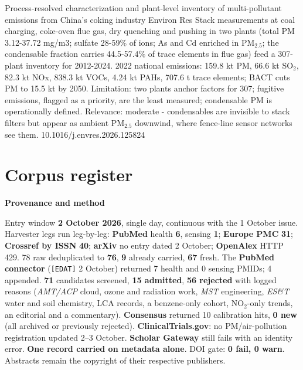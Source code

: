 \documentclass[10pt]{article}
\begin{document}
\par{}\baselineskip{}\baselineskip
{}

{Process-resolved characterization and plant-level inventory of multi-pollutant emissions from China's coking industry}
{Environ Res}
{Stack measurements at coal charging, coke-oven flue gas, dry quenching and pushing in two plants (total PM 3.12-37.72 mg/m3; sulfate 28-59\% of ions; As and Cd enriched in PM$_{2.5}$; the condensable fraction carries 44.5-57.4\% of trace elements in flue gas) feed a 307-plant inventory for 2012-2024. 2022 national emissions: 159.8 kt PM, 66.6 kt SO$_2$, 82.3 kt NOx, 838.3 kt VOCs, 4.24 kt PAHs, 707.6 t trace elements; BACT cuts PM to 15.5 kt by 2050. Limitation: two plants anchor factors for 307; fugitive emissions, flagged as a priority, are the least measured; condensable PM is operationally defined. Relevance: moderate - condensables are invisible to stack filters but appear as ambient PM$_{2.5}$ downwind, where fence-line sensor networks see them.}
{10.1016/j.envres.2026.125824}

\clearpage
\section*{\sffamily\bfseries\color{Deep}Corpus register}
\vspace{-1.5mm}{\color{Amber}\rule{\linewidth}{1.1pt}}\vspace{2.5mm}



\vspace{2mm}

\begin{keybox}
{\sffamily\bfseries\footnotesize\color{Deep}Provenance and method}\\[1.2mm]
{\fontsize{7.2}{8.8}\selectfont
Entry window \textbf{2 October 2026}, single day, continuous with the 1 October issue. Harvester
legs run leg-by-leg: \textbf{PubMed} health \textbf{6}, sensing \textbf{1}; \textbf{Europe PMC} \textbf{31};
\textbf{Crossref by ISSN} \textbf{40}; \textbf{arXiv} no entry dated 2 October; \textbf{OpenAlex} HTTP 429.
78 raw deduplicated to \textbf{76}, \textbf{9} already carried, \textbf{67} fresh. The \textbf{PubMed
connector} (\texttt{[EDAT]} 2 October) returned 7 health and 0 sensing PMIDs; 4 appended. \textbf{71}
candidates screened, \textbf{15 admitted}, \textbf{56 rejected} with logged reasons (\textit{AMT/ACP}
cloud, ozone and radiation work, \textit{MST} engineering, \textit{ES\&T} water and soil chemistry, LCA
records, a benzene-only cohort, NO$_2$-only trends, an editorial and a commentary). \textbf{Consensus}
returned 10 calibration hits, \textbf{0 new} (all archived or previously rejected).
\textbf{ClinicalTrials.gov}: no PM/air-pollution registration updated 2--3 October. \textbf{Scholar
Gateway} still fails with an identity error. \textbf{One record carried on metadata alone}. DOI gate:
\textbf{0 fail, 0 warn}. Abstracts remain the copyright of their respective publishers.\par}
\end{keybox}
\end{document}
